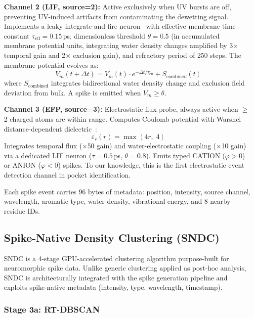 \documentclass{sn-jnl}
\begin{document}
\smallskip\noindent\textbf{Channel 2 (LIF, source=2):} Active exclusively when UV bursts are
off, preventing UV-induced artifacts from contaminating the dewetting signal. Implements a
leaky integrate-and-fire neuron~\cite{gerstner2002} with effective membrane time constant
$\tau_{\text{eff}} = 0.15$\,ps, dimensionless threshold $\theta = 0.5$ (in accumulated
membrane potential units, integrating water density changes amplified by 3$\times$ temporal
gain and 2$\times$ exclusion gain), and refractory period of 250 steps. The membrane
potential evolves as:
\begin{equation}
  V_m(t + \Delta t) = V_m(t) \cdot e^{-\Delta t / \tau_{\text{eff}}} +
  S_{\text{combined}}(t)
  \label{eq:lif}
\end{equation}
where $S_{\text{combined}}$ integrates bidirectional water density change and exclusion
field deviation from bulk. A spike is emitted when $V_m \geq \theta$.

\smallskip\noindent\textbf{Channel 3 (EFP, source=3):} Electrostatic flux probe, always
active when $\geq$2 charged atoms are within range. Computes Coulomb potential with Warshel
distance-dependent dielectric~\cite{warshel1976}:
\begin{equation}
  \varepsilon_r(r) = \max(4r, \; 4)
  \label{eq:warshel}
\end{equation}
Integrates temporal flux ($\times$50 gain) and water-electrostatic coupling ($\times$10
gain) via a dedicated LIF neuron ($\tau = 0.5$\,ps, $\theta = 0.8$). Emits typed CATION
($\varphi > 0$) or ANION ($\varphi < 0$) spikes. To our knowledge, this is the first
electrostatic event detection channel in pocket identification.

\smallskip\noindent Each spike event carries 96 bytes of metadata: position, intensity,
source channel, wavelength, aromatic type, water density, vibrational energy, and 8 nearby
residue IDs.

\subsection{Spike-Native Density Clustering (SNDC)}
\label{sec:sndc}

SNDC is a 4-stage GPU-accelerated clustering algorithm purpose-built for neuromorphic spike
data. Unlike generic clustering applied as post-hoc analysis, SNDC is architecturally
integrated with the spike generation pipeline and exploits spike-native metadata (intensity,
type, wavelength, timestamp).

\subsubsection{Stage 3a: RT-DBSCAN}
\end{document}
